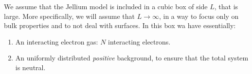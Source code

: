 \documentclass[../main/main.tex]{subfiles}
\begin{document}
We assume that the Jellium model is included in a cubic box of side \( L \), that is large. More specifically, we will assume that \( L \rightarrow \infty  \), in a way to focus only on bulk properties and to not deal with surfaces. In this box wa have essentially:
\begin{enumerate}
\item An interacting electron gas: \( N \) interacting electrons.
\item An uniformly distributed \emph{positive} background, to ensure that the total system is neutral.
\end{enumerate}
\end{document}
